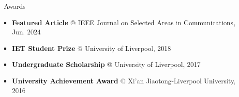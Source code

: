 \documentclass{cv}
\begin{document}
\begin{section}{\faStar\ Awards}
	\begin{itemize}
		\item \textbf{Featured Article} @ IEEE Journal on Selected Areas in Communications, Jun. 2024
		\item \textbf{IET Student Prize} @ University of Liverpool, 2018
		\item \textbf{Undergraduate Scholarship} @ University of Liverpool, 2017
		\item \textbf{University Achievement Award} @ Xi'an Jiaotong-Liverpool University, 2016
	\end{itemize}
\end{section}

\end{document}
